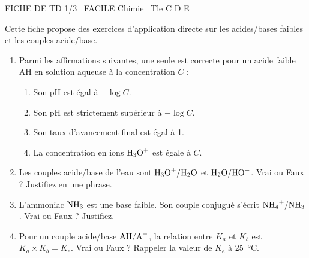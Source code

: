 \documentclass[11pt]{article}
\begin{document}
\begin{tcolorbox}[enhanced,colback=popink,colframe=popink,arc=10pt,boxrule=0pt,left=12pt,right=12pt,top=9pt,bottom=9pt]
{\color{white}\popxbold\small FICHE DE TD 1/3 \textbullet\ FACILE \hfill Chimie \textbullet\ Tle C D E\par}
\end{tcolorbox}
\vspace{4pt}
Cette fiche propose des exercices d'application directe sur les acides/bases faibles et les couples acide/base.

\begin{exercice}
\begin{enumerate}
    \item Parmi les affirmations suivantes, une seule est correcte pour un acide faible AH en solution aqueuse à la concentration $C$ :
    \begin{enumerate}
        \item Son pH est égal à $-\log C$.
        \item Son pH est strictement supérieur à $-\log C$.
        \item Son taux d'avancement final est égal à 1.
        \item La concentration en ions $\ce{H3O+}$ est égale à $C$.
    \end{enumerate}
    \item Les couples acide/base de l'eau sont $\ce{H3O+/H2O}$ et $\ce{H2O/HO-}$. Vrai ou Faux ? Justifiez en une phrase.
    \item L'ammoniac $\ce{NH3}$ est une base faible. Son couple conjugué s'écrit $\ce{NH4+/NH3}$. Vrai ou Faux ? Justifiez.
    \item Pour un couple acide/base $\ce{AH/A-}$, la relation entre $K_a$ et $K_b$ est $K_a \times K_b = K_e$. Vrai ou Faux ? Rappeler la valeur de $K_e$ à \SI{25}{\celsius}.
\end{enumerate}
\end{exercice}
\end{document}
